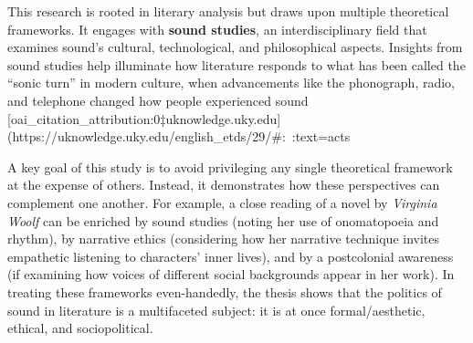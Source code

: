 \documentclass[12pt]{report}
\begin{document}
This research is rooted in literary analysis but draws upon multiple theoretical frameworks. It engages with \textbf{sound studies}, an interdisciplinary field that examines sound’s cultural, technological, and philosophical aspects. Insights from sound studies help illuminate how literature responds to what has been called the “sonic turn” in modern culture, when advancements like the phonograph, radio, and telephone changed how people experienced sound [oai_citation_attribution:0‡uknowledge.uky.edu](https://uknowledge.uky.edu/english_etds/29/#:~:text=acts%

A key goal of this study is to avoid privileging any single theoretical framework at the expense of others. Instead, it demonstrates how these perspectives can complement one another. For example, a close reading of a novel by \textit{Virginia Woolf} can be enriched by sound studies (noting her use of onomatopoeia and rhythm), by narrative ethics (considering how her narrative technique invites empathetic listening to characters’ inner lives), and by a postcolonial awareness (if examining how voices of different social backgrounds appear in her work). In treating these frameworks even-handedly, the thesis shows that the politics of sound in literature is a multifaceted subject: it is at once formal/aesthetic, ethical, and sociopolitical.
\end{document}
